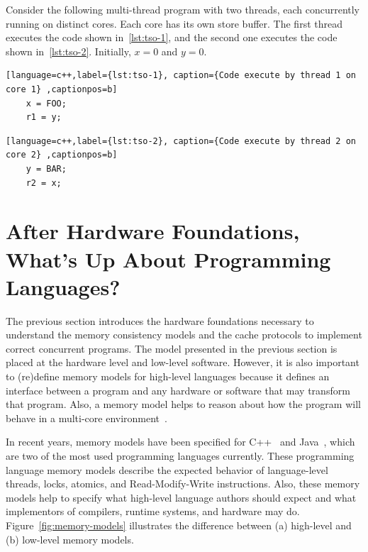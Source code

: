 \begin{example}
  \label{ex:tso-problem}

  Consider the following multi-thread program with two threads, each concurrently running on distinct cores. Each core has its own store buffer. The first thread executes the code shown in~\ref{lst:tso-1}, and the second one executes the code shown in~\ref{lst:tso-2}. Initially, \(x = 0\) and \(y = 0\).

  \begin{lstlisting}[language=c++,label={lst:tso-1}, caption={Code execute by thread 1 on core 1} ,captionpos=b]
    x = FOO;
    r1 = y;
\end{lstlisting}

  \begin{lstlisting}[language=c++,label={lst:tso-2}, caption={Code execute by thread 2 on core 2} ,captionpos=b]
    y = BAR;
    r2 = x;
  \end{lstlisting}



\end{example}




\section{After Hardware Foundations, What's Up About Programming Languages?}

The previous section introduces the hardware foundations necessary to understand the memory consistency models and the cache protocols to implement correct concurrent programs. The model presented in the previous section is placed at the hardware level and low-level software. However, it is also important to (re)define memory models for high-level languages because it defines an interface between a program and any hardware or software that may transform that program. Also, a memory model helps to reason about how the program will behave in a multi-core environment~\cite{DBLP_journals_cacm_AdveB10, DBLP_series_synthesis_2020Nagarajan}.

In recent years, memory models have been specified for C++~\cite{DBLP_conf_pldi_BoehmA08} and Java~\cite{DBLP_conf_popl_MansonPA05}, which are two of the most used programming languages currently. These programming language memory models describe the expected behavior of language-level threads, locks, atomics, and Read-Modify-Write instructions. Also, these memory models help to specify what high-level language authors should expect and what implementors of compilers, runtime systems, and hardware may do. Figure~\ref{fig:memory-models} illustrates the difference between (a) high-level and (b) low-level memory models.

